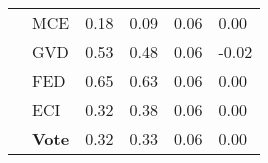 \begin{tabularx}{\linewidth}{*{6}{X}}
 & MCE & {\cellcolor[HTML]{FCB499}} \color[HTML]{000000} 0.18 & {\cellcolor[HTML]{9DCAE1}} \color[HTML]{000000} 0.09  & {\cellcolor[HTML]{FEE6DA}} \color[HTML]{000000} 0.06 & {\cellcolor[HTML]{C1D9ED}} \color[HTML]{000000} 0.00 \\
 & GVD & {\cellcolor[HTML]{B61319}} \color[HTML]{F1F1F1} 0.53 & {\cellcolor[HTML]{125DA6}} \color[HTML]{F1F1F1} 0.48  & {\cellcolor[HTML]{FEE6DA}} \color[HTML]{000000} 0.06 & {\cellcolor[HTML]{C7DCEF}} \color[HTML]{000000} -0.02 \\
 & FED & {\cellcolor[HTML]{67000D}} \color[HTML]{F1F1F1} 0.65 & {\cellcolor[HTML]{08306B}} \color[HTML]{F1F1F1} 0.63  & {\cellcolor[HTML]{FEE6DA}} \color[HTML]{000000} 0.06 & {\cellcolor[HTML]{C1D9ED}} \color[HTML]{000000} 0.00 \\
 & ECI & {\cellcolor[HTML]{FB694A}} \color[HTML]{F1F1F1} 0.32 & {\cellcolor[HTML]{2C7CBA}} \color[HTML]{F1F1F1} 0.38  & {\cellcolor[HTML]{FEE6DA}} \color[HTML]{000000} 0.06 & {\cellcolor[HTML]{C1D9ED}} \color[HTML]{000000} 0.00 \\
 & \textbf{Vote} & {\cellcolor[HTML]{FB694A}} \color[HTML]{F1F1F1} 0.32 & {\cellcolor[HTML]{3989C1}} \color[HTML]{F1F1F1} 0.33  & {\cellcolor[HTML]{FEE6DA}} \color[HTML]{000000} 0.06 & {\cellcolor[HTML]{C1D9ED}} \color[HTML]{000000} 0.00 \\
\bottomrule
\end{tabularx}
